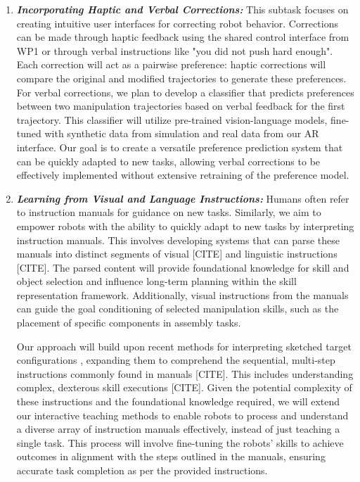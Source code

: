\documentclass{erc-B2}
\begin{document}
\begin{enumerate}
\item \textit{\textbf{Incorporating Haptic and Verbal Corrections:}}
This subtask focuses on creating intuitive user interfaces for correcting robot behavior. Corrections can be made through haptic feedback using the shared control interface from WP1 or through verbal instructions like "you did not push hard enough". Each correction will act as a pairwise preference: haptic corrections will compare the original and modified trajectories to generate these preferences. For verbal corrections, we plan to develop a classifier that predicts preferences between two manipulation trajectories based on verbal feedback for the first trajectory. This classifier will utilize pre-trained vision-language models, fine-tuned with synthetic data from simulation and real data from our AR interface. Our goal is to create a versatile preference prediction system that can be quickly adapted to new tasks, allowing verbal corrections to be effectively implemented without extensive retraining of the preference model.

\item \textit{\textbf{Learning from Visual and Language Instructions:}} Humans often refer to instruction manuals for guidance on new tasks. Similarly, we aim to empower robots with the ability to quickly adapt to new tasks by interpreting instruction manuals. This involves developing systems that can parse these manuals into distinct segments of visual [CITE] and linguistic instructions [CITE]. The parsed content will provide foundational knowledge for skill and object selection and influence long-term planning within the skill representation framework. Additionally, visual instructions from the manuals can guide the goal conditioning of selected manipulation skills, such as the placement of specific components in assembly tasks.

Our approach will build upon recent methods for interpreting sketched target configurations \cite{Sundaresan2023RTSketch}, expanding them to comprehend the sequential, multi-step instructions commonly found in manuals [CITE]. This includes understanding complex, dexterous skill executions [CITE]. Given the potential complexity of these instructions and the foundational knowledge required, we will extend our interactive teaching methods to enable robots to process and understand a diverse array of instruction manuals effectively, instead of just teaching a single task. This process will involve fine-tuning the robots' skills to achieve outcomes in alignment with the steps outlined in the manuals, ensuring accurate task completion as per the provided instructions. 


\end{enumerate}
\end{document}
